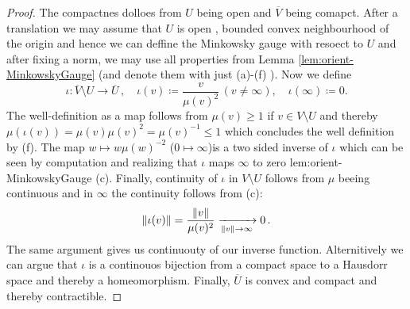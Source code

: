 \begin{proof}
    The compactnes dolloes from $U$ being open and $\overline{V}$ being comapct. After a translation we may assume that $U$ is open , bounded convex neighbourhood of the origin and hence we can deffine the Minkowsky gauge with resoect to $U$ and after fixing a norm, we may use all properties from Lemma \ref{lem:orient-MinkowskyGauge} (and denote them with just (a)-(f) ). Now we define
    \begin{equation*}
        \iota:\overline{V}\setminus U \to \overline{U}\,,\quad \iota (v)\coloneq \frac{v}{\mu(v)^2}\, (v\neq \infty), \quad \iota(\infty)\coloneq 0. 
    \end{equation*} The well-definition as a map follows from $\mu(v)\geq 1$ if $v\in V\setminus U$ and thereby $\mu(\iota(v))=\mu(v)\mu(v)^2=\mu(v)^{-1}\leq 1$ which concludes the well definition by (f). The map $w\mapsto w\mu(w)^{-2}$ ($0\mapsto \infty$)is a two sided inverse of $\iota$ which can be seen by computation and realizing that $\iota$ maps $\infty$ to zero {lem:orient-MinkowskyGauge} (c). Finally, continuity of $\iota$ in $V\setminus U$ follows from $\mu$ beeing continuous and in $\infty$ the continuity follows from (c):
    \begin{equation*}
        \left\lVert\iota(v)\right\rVert
        =\frac{\left\lVert v\right\rVert}{\mu(v)^2} \xrightarrow[ \left\lVert v\right\rVert\to \infty ]{ ~} 0\,.
    \end{equation*} 
    The same argument gives us continuouty of our inverse function. Alternitively we can argue that $\iota$ is a continouos bijection from a compact space to a Hausdorr space and thereby a homeomorphism. Finally, $\overline{U}$ is convex and compact and thereby contractible.
\end{proof}

